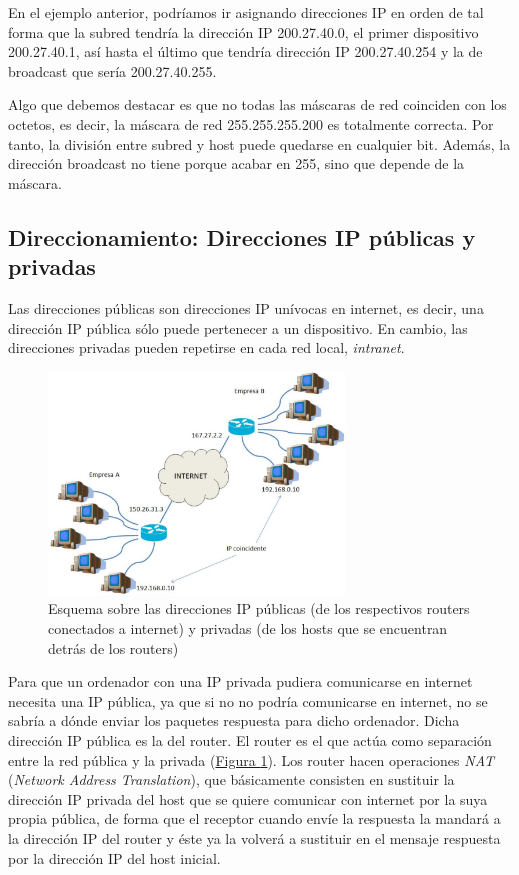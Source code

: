 \documentclass[10pt,a4paper,spanish]{report}
\begin{document}
En el ejemplo anterior, podríamos ir asignando direcciones IP en orden de tal forma que la subred tendría la dirección IP 200.27.40.0, el primer dispositivo 200.27.40.1, así hasta el último que tendría dirección IP 200.27.40.254 y la de broadcast que sería 200.27.40.255.

Algo que debemos destacar es que no todas las máscaras de red coinciden con los octetos, es decir, la máscara de red 255.255.255.200 es totalmente correcta. Por tanto, la división entre subred y host puede quedarse en cualquier bit. Además, la dirección broadcast no tiene porque acabar en 255, sino que depende de la máscara.

\subsection{\textcolor{tema4}Direccionamiento: Direcciones IP públicas y privadas}
Las direcciones públicas son direcciones IP unívocas en internet, es decir, una dirección IP pública sólo puede pertenecer a un dispositivo. En cambio, las direcciones privadas pueden repetirse en cada red local, \textit{\textcolor{tema4}{intranet}}.

\begin{figure}[!h]
  \centering
  \includegraphics[width=0.7\textwidth]{dirippubpriv}
  \caption{Esquema sobre las direcciones IP públicas (de los respectivos routers conectados a internet) y privadas (de los hosts que se encuentran detrás de los routers)}
  \label{dirippubpriv}
\end{figure}


Para que un ordenador con una IP privada pudiera comunicarse en internet necesita una IP pública, ya que si no no podría comunicarse en internet, no se sabría a dónde enviar los paquetes respuesta para dicho ordenador. Dicha dirección IP pública es la del router. El router es el que actúa como separación entre la red pública y la privada (\hyperref[dirippubpriv]{Figura \ref*{dirippubpriv}}). Los router hacen operaciones \textit{\textcolor{tema4}{NAT}} (\textit{\textcolor{tema4}{Network Address Translation}}), que básicamente consisten en sustituir la dirección IP privada del host que se quiere comunicar con internet por la suya propia pública, de forma que el receptor cuando envíe la respuesta la mandará a la dirección IP del router y éste ya la volverá a sustituir en el mensaje respuesta por la dirección IP del host inicial.
\end{document}
